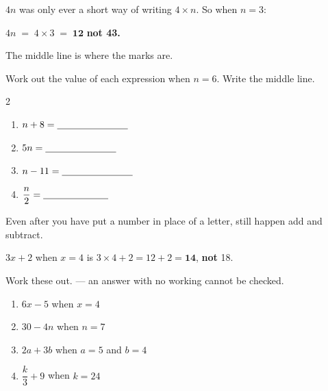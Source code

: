 \documentclass[12pt,a4paper]{article}
\begin{document}
\begin{remember}
  $4n$ was only ever a short way of writing $4 \times n$. So when $n = 3$:

  \smallskip
  \hspace*{1.2em}$4n \;=\; 4 \times 3 \;=\; \mathbf{12}$ \qquad
  {\color{cbred}\bfseries not 43.}

  \smallskip
  The middle line is where the marks are. 
\end{remember}

\noindent Work out the value of each expression when $n = 6$. Write the middle line.

\vspace{4pt}
\begin{multicols}{2}
\begin{enumerate}[label=(\alph*), itemsep=11pt]
  \item $n + 8 = \blank[2.6cm]$
  \item $5n = \blank[2.6cm]$
  \item $n - 11 = \blank[2.6cm]$
  \item $\dfrac{n}{2} = \blank[2.4cm]$
\end{enumerate}
\end{multicols}


\begin{remember}
  Even after you have put a number in place of a letter, 
  still happen  add and subtract.

  \smallskip
  \hspace*{1.2em}$3x + 2$ \; when $x = 4$ \; is \; $3 \times 4 + 2 = 12 + 2 =
  \mathbf{14}$, \; \textbf{not} 18.
\end{remember}

\noindent Work these out.  --- an answer with no working
cannot be checked.

\vspace{4pt}
\begin{enumerate}[label=(\alph*), itemsep=11pt]
  \item $6x - 5$ \quad when $x = 4$ \hfill \blank[6.4cm]
  \item $30 - 4n$ \quad when $n = 7$ \hfill \blank[6.4cm]
  \item $2a + 3b$ \quad when $a = 5$ and $b = 4$ \hfill \blank[6.4cm]
  \item $\dfrac{k}{3} + 9$ \quad when $k = 24$ \hfill \blank[6.4cm]
\end{enumerate}
\end{document}
